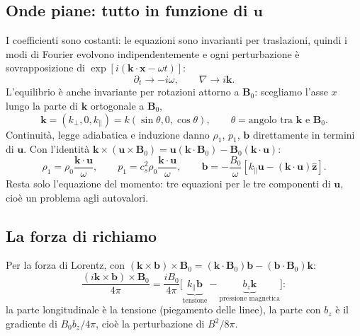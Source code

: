 \subsection{Onde piane: tutto in funzione di $\mathbf{u}$}

I coefficienti sono costanti: le equazioni sono invarianti per traslazioni, quindi i modi di Fourier evolvono indipendentemente e ogni perturbazione è sovrapposizione di $\exp[i(\mathbf{k}\cdot\mathbf{x}-\omega t)]$:
\begin{equation}
\partial_t\to-i\omega,\qquad\nabla\to i\mathbf{k}.
\end{equation}
L'equilibrio è anche invariante per rotazioni attorno a $\mathbf{B}_0$: scegliamo l'asse $x$ lungo la parte di $\mathbf{k}$ ortogonale a $\mathbf{B}_0$,
\begin{equation}
\mathbf{k}=(k_\perp,0,k_\parallel)=k(\sin\theta,0,\cos\theta),\qquad\theta=\text{angolo tra }\mathbf{k}\text{ e }\mathbf{B}_0 .
\end{equation}
Continuità, legge adiabatica e induzione danno $\rho_1$, $p_1$, $\mathbf{b}$ direttamente in termini di $\mathbf{u}$. Con l'identità $\mathbf{k}\times(\mathbf{u}\times\mathbf{B}_0)=\mathbf{u}(\mathbf{k}\cdot\mathbf{B}_0)-\mathbf{B}_0(\mathbf{k}\cdot\mathbf{u})$:
\begin{equation}
\rho_1=\rho_0\frac{\mathbf{k}\cdot\mathbf{u}}{\omega},\qquad
p_1=c_s^2\rho_0\frac{\mathbf{k}\cdot\mathbf{u}}{\omega},\qquad
\mathbf{b}=-\frac{B_0}{\omega}\left[k_\parallel\mathbf{u}-(\mathbf{k}\cdot\mathbf{u})\hat{\mathbf{z}}\right].
\end{equation}
Resta solo l'equazione del momento: tre equazioni per le tre componenti di $\mathbf{u}$, cioè un problema agli autovalori.

\subsection{La forza di richiamo}

Per la forza di Lorentz, con $(\mathbf{k}\times\mathbf{b})\times\mathbf{B}_0=(\mathbf{k}\cdot\mathbf{B}_0)\mathbf{b}-(\mathbf{b}\cdot\mathbf{B}_0)\mathbf{k}$:
\begin{equation}
\frac{(i\mathbf{k}\times\mathbf{b})\times\mathbf{B}_0}{4\pi}=\frac{iB_0}{4\pi}\Big[\underbrace{k_\parallel\mathbf{b}}_{\text{tensione}}-\underbrace{b_z\mathbf{k}}_{\text{pressione magnetica}}\Big]:
\end{equation}
la parte longitudinale è la tensione (piegamento delle linee), la parte con $b_z$ è il gradiente di $B_0b_z/4\pi$, cioè la perturbazione di $B^2/8\pi$.

